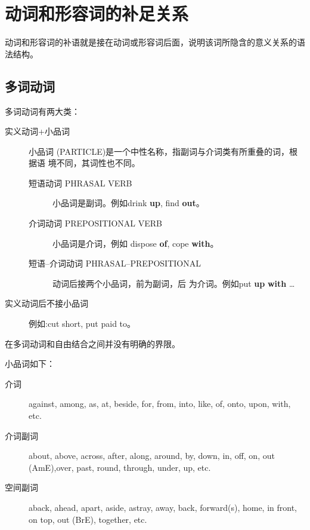 
\section{动词和形容词的补足关系}

动词和形容词的补语就是接在动词或形容词后面，说明该词所隐含的意义关系的语法结构。

\subsection{多词动词}

多词动词有两大类：
\begin{description}
\item[实义动词+小品词] 小品词 (PARTICLE)是一个中性名称，指副词与介词类有所重叠的词，根据语
  境不同，其词性也不同。
  \begin{description}
  \item[短语动词 PHRASAL VERB] 小品词是副词。例如drink \textbf{up}, find
    \textbf{out}。

  \item[介词动词 PREPOSITIONAL VERB] 小品词是介词，例如 dispose \textbf{of},
    cope \textbf{with}。

  \item[短语--介词动词 PHRASAL--PREPOSITIONAL] 动词后接两个小品词，前为副词，后
    为介词。例如put
    \textbf{up} \textbf{with} \ldots{}
  \end{description}

\item[实义动词后不接小品词] 例如:cut short, put paid to。

\end{description}

在多词动词和自由结合之间并没有明确的界限。

小品词如下：
\begin{description}
\item[介词] against, among, as, at, beside, for, from, into, like, of, onto,
upon, with, etc.

\item[介词副词] about, above, across, after, along, around, by, down, in, off,
on, out (AmE),over, past, round, through, under, up, etc.

\item[空间副词] aback, ahead, apart, aside, astray, away, back, forward(s),
home, in front, on top, out (BrE), together, etc.

\end{description}

